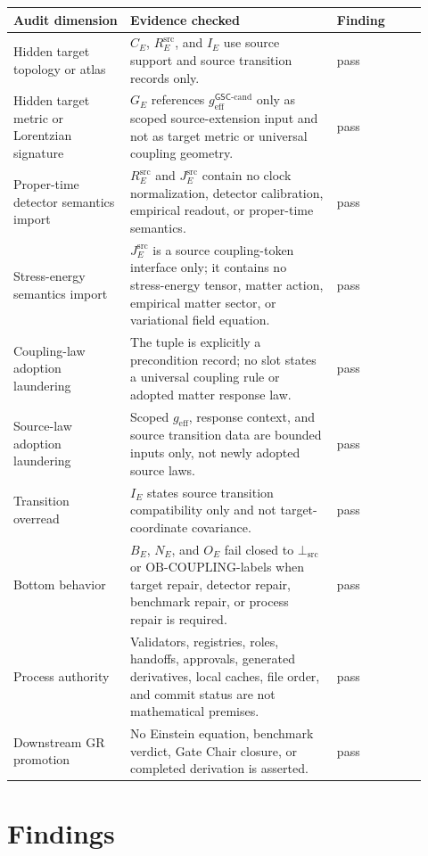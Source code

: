 \documentclass[11pt]{article}
\newcommand{\geff}{g_{\mathrm{eff}}}
\newcommand{\geffCand}{g_{\mathrm{eff}}^{\mathsf{GSC}\mbox{-}\mathrm{cand}}}
\newcommand{\BottomSrc}{\bot_{\mathrm{src}}}
\newcommand{\OBCoupling}{\mathrm{OB}\mbox{-}\mathrm{COUPLING}}
\begin{document}
\begin{longtable}{p{0.26\linewidth}p{0.46\linewidth}p{0.20\linewidth}}
\toprule
Audit dimension & Evidence checked & Finding \\
\midrule
Hidden target topology or atlas & \(C_E\), \(R^{\mathrm{src}}_E\), and
\(I_E\) use source support and source transition records only. & pass \\
Hidden target metric or Lorentzian signature & \(G_E\) references
\(\geffCand\) only as scoped source-extension input and not as target metric
or universal coupling geometry. & pass \\
Proper-time detector semantics import & \(R^{\mathrm{src}}_E\) and
\(J^{\mathrm{src}}_E\) contain no clock normalization, detector calibration,
empirical readout, or proper-time semantics. & pass \\
Stress-energy semantics import & \(J^{\mathrm{src}}_E\) is a source
coupling-token interface only; it contains no stress-energy tensor, matter
action, empirical matter sector, or variational field equation. & pass \\
Coupling-law adoption laundering & The tuple is explicitly a precondition
record; no slot states a universal coupling rule or adopted matter response
law. & pass \\
Source-law adoption laundering & Scoped \(\geff\), response context, and
source transition data are bounded inputs only, not newly adopted source laws.
& pass \\
Transition overread & \(I_E\) states source transition compatibility only and
not target-coordinate covariance. & pass \\
Bottom behavior & \(B_E\), \(N_E\), and \(O_E\) fail closed to \(\BottomSrc\)
or \(\OBCoupling\)-labels when target repair, detector repair, benchmark
repair, or process repair is required. & pass \\
Process authority & Validators, registries, roles, handoffs, approvals,
generated derivatives, local caches, file order, and commit status are not
mathematical premises. & pass \\
Downstream GR promotion & No Einstein equation, benchmark verdict, Gate
Chair closure, or completed derivation is asserted. & pass \\
\bottomrule
\end{longtable}

\section{Findings}
\end{document}
